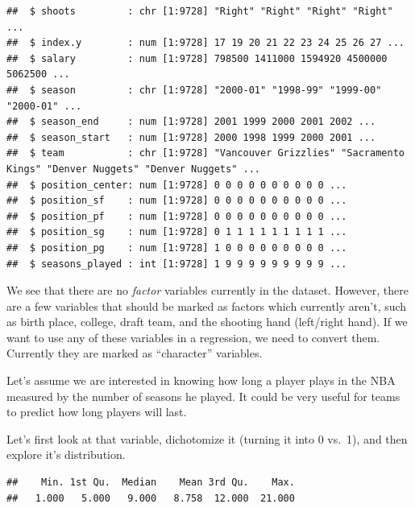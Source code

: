 \documentclass[
]{book}
\newenvironment{Shaded}{\begin{snugshade}}{\end{snugshade}}
\newcommand{\CommentTok}[1]{\textcolor[rgb]{0.56,0.35,0.01}{\textit{#1}}}
\newcommand{\FunctionTok}[1]{\textcolor[rgb]{0.13,0.29,0.53}{\textbf{#1}}}
\newcommand{\NormalTok}[1]{#1}
\newcommand{\SpecialCharTok}[1]{\textcolor[rgb]{0.81,0.36,0.00}{\textbf{#1}}}
\newcommand{\StringTok}[1]{\textcolor[rgb]{0.31,0.60,0.02}{#1}}
\begin{document}
\begin{verbatim}
##  $ shoots         : chr [1:9728] "Right" "Right" "Right" "Right" ...
##  $ index.y        : num [1:9728] 17 19 20 21 22 23 24 25 26 27 ...
##  $ salary         : num [1:9728] 798500 1411000 1594920 4500000 5062500 ...
##  $ season         : chr [1:9728] "2000-01" "1998-99" "1999-00" "2000-01" ...
##  $ season_end     : num [1:9728] 2001 1999 2000 2001 2002 ...
##  $ season_start   : num [1:9728] 2000 1998 1999 2000 2001 ...
##  $ team           : chr [1:9728] "Vancouver Grizzlies" "Sacramento Kings" "Denver Nuggets" "Denver Nuggets" ...
##  $ position_center: num [1:9728] 0 0 0 0 0 0 0 0 0 0 ...
##  $ position_sf    : num [1:9728] 0 0 0 0 0 0 0 0 0 0 ...
##  $ position_pf    : num [1:9728] 0 0 0 0 0 0 0 0 0 0 ...
##  $ position_sg    : num [1:9728] 0 1 1 1 1 1 1 1 1 1 ...
##  $ position_pg    : num [1:9728] 1 0 0 0 0 0 0 0 0 0 ...
##  $ seasons_played : int [1:9728] 1 9 9 9 9 9 9 9 9 9 ...
\end{verbatim}

We see that there are no \emph{factor} variables currently in the dataset. However,
there are a few variables that should be marked as factors which currently
aren't, such as birth place, college, draft team, and the shooting hand (left/right hand).
If we want to use any of these variables in a regression, we need to convert them.
Currently they are marked as ``character'' variables.

Let's assume we are interested in knowing how long a player plays in the NBA
measured by the number of seasons he played. It could be very useful for teams to predict
how long players will last.

Let's first look at that variable, dichotomize it (turning it into 0 vs.~1), and
then explore it's distribution.

\begin{Shaded}
\end{Shaded}

\begin{verbatim}
##    Min. 1st Qu.  Median    Mean 3rd Qu.    Max. 
##   1.000   5.000   9.000   8.758  12.000  21.000
\end{verbatim}
\end{document}
